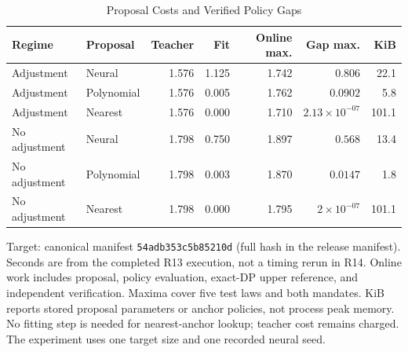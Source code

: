 \begin{table}[t]
\caption{Proposal Costs and Verified Policy Gaps}\label{tab:proposals}
\centering
\footnotesize
\begin{tabular}{@{}llrrrrr@{}}
\toprule
Regime & Proposal & Teacher & Fit & Online max. & Gap max. & KiB \\
\midrule
Adjustment & Neural & 1.576 & 1.125 & 1.742 & $0.806$ & 22.1 \\
Adjustment & Polynomial & 1.576 & 0.005 & 1.762 & $0.0902$ & 5.8 \\
Adjustment & Nearest & 1.576 & 0.000 & 1.710 & $2.13\times10^{-07}$ & 101.1 \\
No adjustment & Neural & 1.798 & 0.750 & 1.897 & $0.568$ & 13.4 \\
No adjustment & Polynomial & 1.798 & 0.003 & 1.870 & $0.0147$ & 1.8 \\
No adjustment & Nearest & 1.798 & 0.000 & 1.795 & $2\times10^{-07}$ & 101.1 \\
\bottomrule
\end{tabular}
\par\smallskip\begin{minipage}{\linewidth}\footnotesize Target: canonical manifest \texttt{54adb353c5b85210d} (full hash in the release manifest). Seconds are from the completed R13 execution, not a timing rerun in R14. Online work includes proposal, policy evaluation, exact-DP upper reference, and independent verification. Maxima cover five test laws and both mandates. KiB reports stored proposal parameters or anchor policies, not process peak memory. No fitting step is needed for nearest-anchor lookup; teacher cost remains charged. The experiment uses one target size and one recorded neural seed.\end{minipage}
\end{table}
